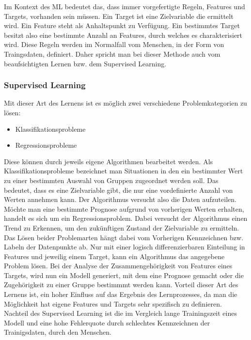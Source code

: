 \documentclass[12pt,german,ngerman]{report}
\begin{document}
        Im Kontext des ML bedeutet das, dass immer vorgefertigte Regeln, Features und Targets, vorhanden sein müssen.
        Ein Target ist eine Zielvariable die ermittelt wird. 
        Ein Feature steht als Anhaltspunkt zu Verfügung.
        Ein bestimmtes Target
        besitzt also eine bestimmte Anzahl an Features, durch welches es charakterisiert wird.
        Diese Regeln werden im Normalfall vom Menschen, in der Form von Traingsdaten, definiert. Daher spricht man bei dieser Methode
        auch vom beaufsichtigten Lernen bzw. dem Supervised Learning.

        \subsubsection{Supervised Learning}
            Mit dieser Art des Lernens ist es möglich zwei verschiedene 
            Problemkategorien zu lösen\cite{supervisedlearning2021ibm}:

            \begin{itemize}
                \item{Klassifikationsprobleme}
                \item{Regressionsprobleme}
            \end{itemize}

            Diese können durch jeweils eigene Algorithmen bearbeitet werden.
            Als Klassifikationsprobleme bezeichnet man Situationen in den ein bestimmter Wert zu einer
            bestimmten Auswahl von Gruppen zugeordnet werden soll. Das bedeutet, dass es eine Zielvariable gibt, die
            nur eine vordefinierte Anzahl von Werten annehmen kann.\cite{kibuisness2021supervised}
            Der Algorithmus versucht also die Daten aufzuteilen.
            Möchte man eine bestimmte Prognose aufgrund von vorherigen Werten erhalten,
            handelt es sich um ein Regressionsproblem.\cite{kibuisness2021supervised}
            Dabei versucht der Algorithmus einen Trend zu Erkennen, um den zukünftigen Zustand der Zielvariable zu ermitteln. 
            Das Lösen beider Problemarten hängt dabei vom Vorherigen Kennzeichnen bzw. Labeln der Datenpunkte ab.
            Nur mit einer logisch differenzierbaren Einteilung in Features und jeweilig einem Target, 
            kann ein Algorithmus das angegebene Problem lösen.
            Bei der Analyse der Zusammengehörigkeit von Features eines Targets, wird nun ein Modell
            generiert, mit dem eine Prognose gemacht oder die Zugehörigkeit zu einer Gruppe bestimmmt werden kann.
            Vorteil dieser Art des Lernens ist, ein hoher Einfluss auf das Ergebnis des Lernprozesses,
            da man die Möglichkeit hat eigene Features und Targets sehr spezifisch zu definieren.
            Nachteil des Supervised Learning ist die im Vergleich lange Trainingszeit eines Modell
            und eine hohe Fehlerquote durch schlechtes Kennzeichnen der Trainigsdaten, durch den Menschen.
            
\end{document}
